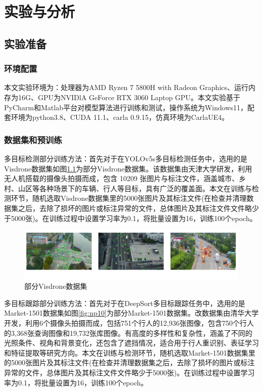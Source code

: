 \chapter{实验与分析}

\section{实验准备}

\subsection{环境配置}
本文实验环境为：处理器为AMD Ryzen 7 5800H with Radeon Graphics、运行内存为16G、GPU为NVIDlA GeForce RTX 3060 Laptop GPU。本文实验基于PyCharm和Matlab平台对模型算法进行训练和测试，操作系统为Windows11，配套环境为python3.8、CUDA 11.1、carla 0.9.15，仿真环境为CarlaUE4。

\subsection{数据集和预训练}

多目标检测部分训练方法：首先对于在YOLOv5s多目标检测任务中，选用的是Visdrone数据集\cite{zhu2018vision}如图\ref{fig:np9}为部分Visdrone数据集。该数据集由天津大学研发，利用无人机搭载的摄像头拍摄而成，包含 10209 张图片与标注文件，涵盖城市、乡村、山区等各种场景下的车辆、行人等目标，具有广泛的覆盖面。本文在训练与检测环节，随机选取Visdrone数据集里的5000张图片及其标注文件(在检查并清理数据集之后，去除了损坏的图片或标注异常的文件，总体图片及其标注文件文件略少于5000张)。在训练过程中设置学习率为0.1，将批量设置为16，训练100个epoch。

\begin{figure}[htbp] %
	\centering
	\includegraphics[width=1\textwidth]{np9} %
	\caption{部分Visdrone数据集} %
	\label{fig:np9} %
\end{figure}


多目标跟踪部分训练方法：首先对于在DeepSort多目标跟踪任务中，选用的是Market-1501数据集\cite{zheng2015scalable}如图\ref{fig:np10}为部分Market-1501数据集。改数据集由清华大学开发，利用6个摄像头拍摄而成，包括751个行人的12,936张图像，包含750个行人的3,368张查询图像和19,732张库图像。有高度的多样性和复杂性，涵盖了不同的光照条件、视角和背景变化，还包含了遮挡情况，适合用于行人重识别、表征学习和特征提取等研究方向。本文在训练与检测环节，随机选取Market-1501数据集里的5000张图片及其标注文件(在检查并清理数据集之后，去除了损坏的图片或标注异常的文件，总体图片及其标注文件文件略少于5000张)。在训练过程中设置学习率为0.1，将批量设置为16，训练100个epoch。





